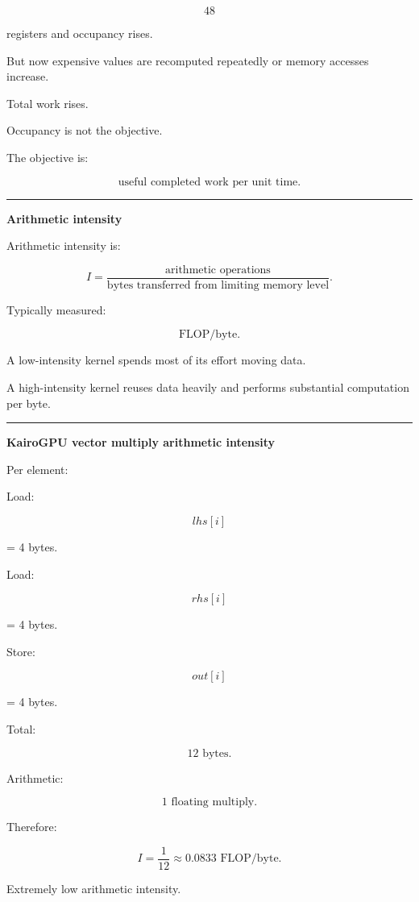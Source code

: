 \[
48
\]

registers and occupancy rises.

But now expensive values are recomputed repeatedly or memory accesses increase.

Total work rises.

Occupancy is not the objective.

The objective is:

\[
\boxed{
\text{useful completed work per unit time}.
}
\]

\begin{center}\rule{0.5\linewidth}{0.5pt}\end{center}

\textbf{Arithmetic intensity}

Arithmetic intensity is:

\[
\boxed{
I=
\frac{
\text{arithmetic operations}
}{
\text{bytes transferred from limiting memory level}
}.
}
\]

Typically measured:

\[
\text{FLOP/byte}.
\]

A low-intensity kernel spends most of its effort moving data.

A high-intensity kernel reuses data heavily and performs substantial computation per byte.

\begin{center}\rule{0.5\linewidth}{0.5pt}\end{center}

\textbf{KairoGPU vector multiply arithmetic intensity}

Per element:

Load:

\[
lhs[i]
\]

= 4 bytes.

Load:

\[
rhs[i]
\]

= 4 bytes.

Store:

\[
out[i]
\]

= 4 bytes.

Total:

\[
12\text{ bytes}.
\]

Arithmetic:

\[
1\text{ floating multiply}.
\]

Therefore:

\[
\boxed{
I=
\frac1{12}
\approx0.0833
\text{ FLOP/byte}.
}
\]

Extremely low arithmetic intensity.

